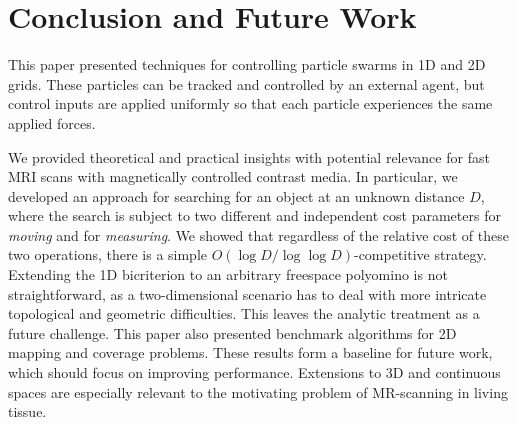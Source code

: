 \section{Conclusion and Future Work}\label{sec:conclusion}

This paper presented techniques for controlling particle swarms in 1D and 2D grids.
These particles can be tracked and controlled by an external agent, but control inputs are applied uniformly so that each particle experiences the same applied forces. 

We provided theoretical and practical insights  with potential relevance for fast MRI scans with magnetically controlled contrast media.
In particular, we developed an approach for searching for an object at an unknown distance $D$, where the search is subject to two different and independent cost parameters
for {\em moving} and for {\em measuring}. 
We showed that regardless of the relative cost of these two operations,
there is a simple $O(\log D/\log\log D)$-competitive strategy. Extending the 1D bicriterion to an arbitrary freespace polyomino is not straightforward,
as a two-dimensional scenario has to deal with more intricate topological and geometric difficulties. This leaves the analytic treatment as a future challenge.
This paper also presented benchmark algorithms for 2D mapping and coverage problems.
These results form a baseline for future work, which should focus on improving performance. 
Extensions to 3D and continuous spaces are especially relevant to the motivating problem of MR-scanning in living tissue.